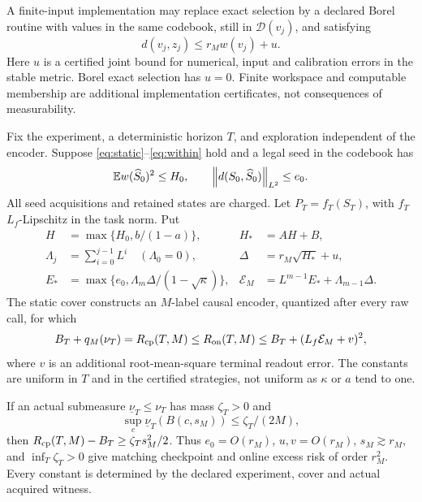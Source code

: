 A finite-input implementation may replace exact selection by a declared Borel routine with values in the same codebook, still in $\mathcal D(v_j)$, and satisfying
\begin{equation}\label{eq:localerror}
 d(v_j,z_j)\le r_M w(v_j)+u.
\end{equation}
Here $u$ is a certified joint bound for numerical, input and calibration errors in the stable metric. Borel exact selection has $u=0$. Finite workspace and computable membership are additional implementation certificates, not consequences of measurability.

\begin{theorem}\label{thm:main}
Fix the experiment, a deterministic horizon $T$, and exploration independent of the encoder. Suppose \eqref{eq:static}--\eqref{eq:within} hold and a legal seed in the codebook has
\[
 \mathbb E w(\widehat S_0)^2\le H_0,\qquad
 \left\lVert d(S_0,\widehat S_0)\right\rVert_{L^2}\le e_0.
\]
All seed acquisitions and retained states are charged. Let $P_T=f_T(S_T)$, with $f_T$ $L_f$-Lipschitz in the task norm. Put
\begin{align}
 H&=\max\{H_0,b/(1-a)\},&H_*&=AH+B,\nonumber\\
 \Lambda_j&=\sum_{i=0}^{j-1}L^i\quad(\Lambda_0=0),&
 \Delta&=r_M\sqrt{H_*}+u,\nonumber\\
 E_*&=\max\{e_0,\Lambda_m\Delta/(1-\sqrt\kappa)\},&
 \mathcal E_M&=L^{m-1}E_*+\Lambda_{m-1}\Delta.\label{eq:constants}
\end{align}
The static cover constructs an $M$-label causal encoder, quantized after every raw call, for which
\begin{equation}\label{eq:mainrisk}
 B_T+q_M(\nu_T)=R_{\mathrm{cp}}(T,M)
 \le R_{\mathrm{on}}(T,M)
 \le B_T+(L_f\mathcal E_M+v)^2,
\end{equation}
where $v$ is an additional root-mean-square terminal readout error. The constants are uniform in $T$ and in the certified strategies, not uniform as $\kappa$ or $a$ tend to one.

If an actual submeasure $\underline\nu_T\le\nu_T$ has mass $\zeta_T>0$ and
\begin{equation}\label{eq:smallball}
 \sup_c\underline\nu_T(B(c,s_M))\le\zeta_T/(2M),
\end{equation}
then $R_{\mathrm{cp}}(T,M)-B_T\ge\zeta_Ts_M^2/2$. Thus $e_0=O(r_M)$, $u,v=O(r_M)$, $s_M\gtrsim r_M$, and $\inf_T\zeta_T>0$ give matching checkpoint and online excess risk of order $r_M^2$. Every constant is determined by the declared experiment, cover and actual acquired witness.
\end{theorem}

